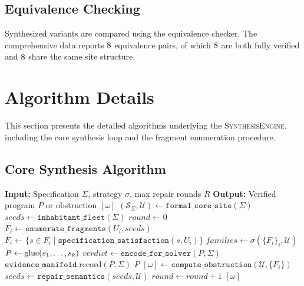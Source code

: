 \documentclass[11pt]{article}
\newcommand{\SynthEngine}{\textsc{SynthesisEngine}}
\newcommand{\SpecSpace}{\mathcal{S}_\Sigma}
\begin{document}
\subsection{Equivalence Checking}
Synthesized variants are compared using the equivalence checker.
The comprehensive data reports $8$ equivalence pairs,
of which $8$ are both fully verified and
$8$ share the same site structure.

\section{Algorithm Details}\label{sec:algorithm-details}

This section presents the detailed algorithms underlying the
\SynthEngine, including the core synthesis loop and the
fragment enumeration procedure.

\subsection{Core Synthesis Algorithm}

\begin{algorithm}[H]
\caption{Core Synthesis Loop}
\label{alg:core-synthesis}
\begin{algorithmic}[1]
\STATE \textbf{Input:} Specification $\Sigma$, strategy $\sigma$,
       max repair rounds $R$
\STATE \textbf{Output:} Verified program $P$ or obstruction $[\omega]$
\STATE $(\SpecSpace, \mathcal{U}) \gets
       \texttt{formal\_core\_site}(\Sigma)$
\STATE $\textit{seeds} \gets \texttt{inhabitant\_fleet}(\Sigma)$
\STATE $\textit{round} \gets 0$
\REPEAT
    \STATE $F_i \gets \texttt{enumerate\_fragments}(U_i, \textit{seeds})$
    \STATE $F_i \gets \{s \in F_i \mid
           \texttt{specification\_satisfaction}(s, U_i)\}$
  \ENDFOR
  \STATE $\textit{families} \gets \sigma(
         \{F_i\}_{i}, \mathcal{U})$
    \STATE $P \gets \mathrm{glue}(s_1, \ldots, s_k)$
    \STATE $\textit{verdict} \gets
           \texttt{encode\_for\_solver}(P, \Sigma)$
      \STATE $\texttt{evidence\_manifold}.\text{record}(P, \Sigma)$
      \RETURN $P$
    \ENDIF
  \ENDFOR
  \STATE $[\omega] \gets
         \texttt{compute\_obstruction}(\mathcal{U}, \{F_i\})$
    \STATE $\textit{seeds} \gets
           \texttt{repair\_semantics}(\textit{seeds}, \mathcal{U})$
    \STATE $\textit{round} \gets \textit{round} + 1$
  \ENDIF
{}
\RETURN $[\omega]$
\end{algorithmic}
\end{algorithm}
\end{document}
